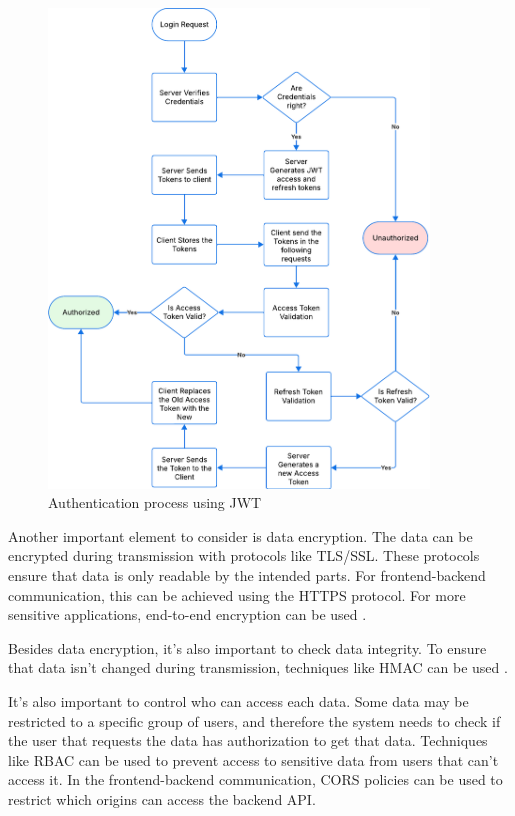 \begin{figure}[htbp]
	\centering
	\includegraphics[width=0.9\textwidth, height=0.6\textheight, keepaspectratio]{Chapters/Figures/Security/JWT.pdf}
	\caption{Authentication process using \gls{JWT}}
	\label{fig:security:JWT}
\end{figure}

Another important element to consider is data encryption.
The data can be encrypted during transmission with protocols like \gls{TLS}/\gls{SSL}.
These protocols ensure that data is only readable by the intended parts.
For frontend-backend communication, this can be achieved using the \gls{HTTPS}
protocol.
For more sensitive applications, end-to-end encryption can be used \cite{schiller2022landscape}.

Besides data encryption, it's also important to check data integrity.
To ensure that data isn't changed during transmission, techniques like
\gls{HMAC} can be used \cite{schiller2022landscape}.

It's also important to control who can access each data.
Some data may be restricted to a specific group of users, and therefore the
system needs to check if the user that requests the data has
authorization to get that data. Techniques like \gls{RBAC} can be used to
prevent access to sensitive data from users that can't access it.
In the frontend-backend communication, \gls{CORS} policies can be used to
restrict which origins can access the backend \gls{API}.

